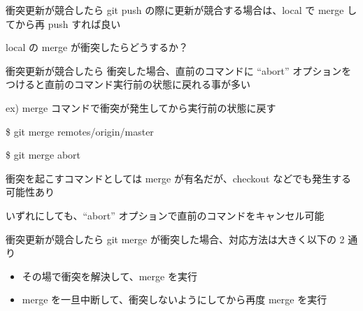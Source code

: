 
\begin{frame}[t]{衝突}{更新が競合したら}
  git push の際に更新が競合する場合は、local で merge してから再 push すれば良い
  \vspace{4ex}

  local の merge が衝突したらどうするか？
\end{frame}


\begin{frame}[t]{衝突}{更新が競合したら}
  衝突した場合、直前のコマンドに ``{\dhyphen}abort'' オプションをつけると直前のコマンド実行前の状態に戻れる事が多い
  \vspace{4ex}

  ex)
  merge コマンドで衝突が発生してから実行前の状態に戻す

  \$ git merge remotes/origin/master

  \$ git merge {\dhyphen}abort
  \vspace{4ex}

  衝突を起こすコマンドとしては merge が有名だが、checkout などでも発生する可能性あり

  いずれにしても、``{\dhyphen}abort'' オプションで直前のコマンドをキャンセル可能
\end{frame}


\begin{frame}[t]{衝突}{更新が競合したら}
  git merge が衝突した場合、対応方法は大きく以下の 2 通り
  \vspace{2ex}

  \begin{itemize}
  \item その場で衝突を解決して、merge を実行
  \item merge を一旦中断して、衝突しないようにしてから再度 merge を実行
  \end{itemize}
  \vspace{4ex}

\end{frame}


